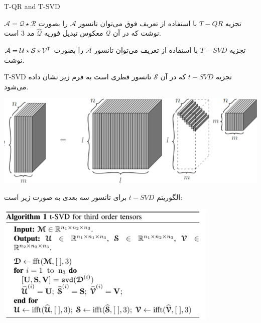 \begin{frame}{T-QR and T-SVD}
\begin{alertblock}{تجزیه $T-QR$}
	با استفاده از تعریف فوق می‌توان تانسور $\mathcal{A}$ را بصورت
	$\mathcal{A}=\mathcal{Q}\star \mathcal{R}$
	نوشت که در آن
	$\mathcal{Q}$
	معکوس تبدیل فوریه 
	$\hat{\mathcal{Q}}$
	مد 3 است.
\end{alertblock}

\pause
{}
\begin{exampleblock}{تجزیه $T-SVD$}
با استفاده از تعریف  می‌توان تانسور $\mathcal{A}$ را بصورت
$\mathcal{A}=\mathcal{U}\star\mathcal{S}\star \mathcal{V}^{\mathsf{T}}$
نوشت.
\end{exampleblock}
\end{frame}
\begin{frame}{T-SVD}
تجزیه $t-SVD$ که در آن $\mathcal{S}$ 
تانسور قطری است به فرم زیر نشان داده می‌شود.

\pause
	\begin{center}
	\includegraphics[width=1\textwidth]{img/ok/T-SVD.pdf}
\end{center}
\end{frame}
\begin{frame}
الگوریتم $t-SVD$ برای تانسور سه بعدی به صورت زیر است:
\begin{center}
	\includegraphics[width=0.8\textwidth]{img/ok/AT-SVD.pdf}
\end{center}
\end{frame}
